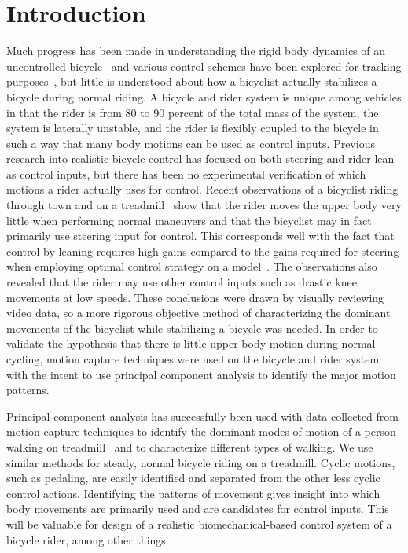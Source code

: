 \documentclass[smallextended]{svjour3}     %
\begin{document}
\section{Introduction}
\label{intro}
Much progress has been made in understanding the rigid body dynamics of an
uncontrolled bicycle~\cite{Meijaard2007} and various control schemes have been
explored for tracking purposes~\cite{Peterson2008a,Schwab2008,Sharp2008a}, but
little is understood about how a bicyclist actually stabilizes a bicycle during
normal riding. A bicycle and rider system is unique among vehicles in
that the rider is from 80 to 90 percent of the total mass of the system, the
system is laterally unstable, and the rider is flexibly coupled to the
bicycle in such a way that many body motions can be used as control inputs.
Previous research into realistic bicycle control has focused on both steering
and rider lean as control inputs, but there has been no experimental
verification of which motions a rider actually uses for control. Recent
observations of a bicyclist riding through town and on a
treadmill~\cite{Kooijman2009a} show that the rider moves the upper body very
little when performing normal maneuvers and that the bicyclist may in fact
primarily use steering input for control. This corresponds well with the fact
that control by leaning requires high gains compared to the gains required for
steering when employing optimal control strategy on a
model~\cite{Peterson2008a,Schwab2008,Sharp2008a}. The observations also
revealed
that the rider may use other control inputs such as drastic knee movements at
low speeds. These conclusions were drawn by visually reviewing video data, so a
more rigorous objective method of characterizing the dominant movements of the
bicyclist while stabilizing a bicycle was needed. In order to validate the
hypothesis that there is little upper body motion during normal cycling, motion
capture techniques were used on the bicycle and rider system with the intent to
use principal component analysis to identify the major motion patterns.

Principal component analysis has successfully been used with data collected
from motion capture techniques to identify the dominant modes of motion of a
person walking on treadmill~\cite{Troje2002} and to characterize different
types of walking. We use similar methods for steady, normal bicycle riding on a
treadmill. Cyclic motions, such as pedaling, are easily identified and
separated from the other less cyclic control actions. Identifying the patterns
of movement gives insight into which body movements are primarily used and are
candidates for control inputs. This will be valuable for design of a realistic
biomechanical-based control system of a bicycle rider, among other things.
\end{document}
